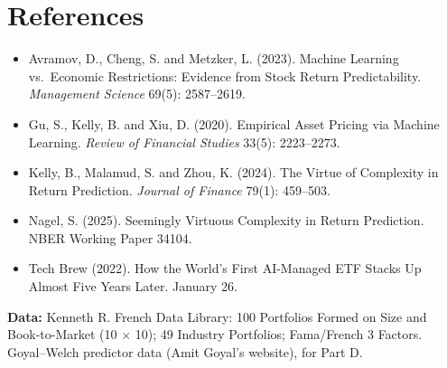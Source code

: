 \section*{References}

\begin{itemize}
  \item Avramov, D., Cheng, S. and Metzker, L. (2023). Machine Learning vs.\ Economic Restrictions: Evidence from Stock Return Predictability. \emph{Management Science} 69(5): 2587--2619.
  \item Gu, S., Kelly, B. and Xiu, D. (2020). Empirical Asset Pricing via Machine Learning. \emph{Review of Financial Studies} 33(5): 2223--2273.
  \item Kelly, B., Malamud, S. and Zhou, K. (2024). The Virtue of Complexity in Return Prediction. \emph{Journal of Finance} 79(1): 459--503.
  \item Nagel, S. (2025). Seemingly Virtuous Complexity in Return Prediction. NBER Working Paper 34104.
  \item Tech Brew (2022). How the World's First AI-Managed ETF Stacks Up Almost Five Years Later. January 26.
\end{itemize}

\textbf{Data:} Kenneth R. French Data Library: 100 Portfolios Formed on Size and Book-to-Market (10 $\times$ 10); 49 Industry Portfolios; Fama/French 3 Factors. Goyal--Welch predictor data (Amit Goyal's website), for Part D.
